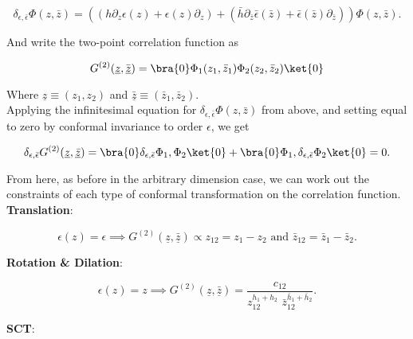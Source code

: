 \begin{equation}
\delta_{\epsilon, \bar{\epsilon}} \Phi (z, \bar{z}) = ((h \partial_z \epsilon(z) + \epsilon (z) \partial_z ) + (\bar{h} \partial_{\bar{z}} \bar{\epsilon}(\bar{z}) + \bar{\epsilon} (\bar{z}) \partial_{\bar{z}} )) \Phi(z, \bar{z}).
\end{equation}

\noindent And write the two-point correlation function as

\begin{equation}
G^{(2)} (\underline{z}, \bar{\underline{z}}) = \bra{0} \Phi_1 (z_1, \bar{z}_1) \Phi_2 (z_2, \bar{z}_2) \ket{0}
\end{equation}

\noindent Where $\underline{z} \equiv (z_1, z_2)$ and $\underline{\bar{z}} \equiv (\bar{z}_1, \bar{z}_2)$. \\

\noindent Applying the infinitesimal equation for $\delta_{\epsilon, \bar{\epsilon}} \Phi (z, \bar{z})$ from above, and setting equal to zero by conformal invariance to order $\epsilon$, we get

\begin{equation}
\delta_{\epsilon, \bar{\epsilon}} G^{(2)} (\underline{z}, \underline{\bar{z}}) = \bra{0} \delta_{\epsilon, \bar{\epsilon}} \Phi_1, \Phi_2 \ket{0} + \bra{0} \Phi_1, \delta_{\epsilon, \bar{\epsilon}} \Phi_2 \ket{0} = 0.
\end{equation}

\noindent From here, as before in the arbitrary dimension case, we can work out the constraints of each type of conformal transformation on the correlation function. \\

\noindent \textbf{Translation}: 

\begin{equation}
\epsilon(z) = \epsilon \implies G^{(2)}(\underline{z}, \underline{\bar{z}}) \propto z_{12} = z_1 - z_2 \text{ and }\bar{z}_{12} = \bar{z}_1 - \bar{z}_2.
\end{equation}

\noindent \textbf{Rotation \& Dilation}: 

\begin{equation}
\epsilon (z) = z \implies G^{(2)}(\underline{z}, \underline{\bar{z}}) = \frac{c_{12}}{z_{12}^{h_1 + h_2} \,\, \bar{z}_{12}^{\bar{h}_1 + \bar{h}_2}}.
\end{equation}

\noindent \textbf{SCT}: 

